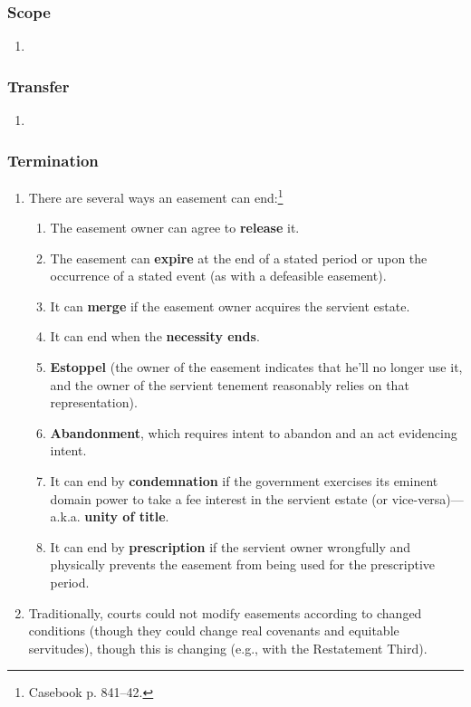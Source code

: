 \subsubsection{Scope}

\begin{enumerate}
    \item %
\end{enumerate}

\subsubsection{Transfer}

\begin{enumerate}
    \item %
\end{enumerate}

\subsubsection{Termination}

\begin{enumerate}
    \item There are several ways an easement can end:\footnote{Casebook p. 
    841--42.}
    \begin{enumerate}
        \item The easement owner can agree to \textbf{release} it.
        \item The easement can \textbf{expire} at the end of a stated period 
        or upon the occurrence of a stated event (as with a defeasible 
        easement).
        \item It can \textbf{merge} if the easement owner acquires the 
        servient estate.
        \item It can end when the \textbf{necessity ends}.
        \item \textbf{Estoppel} (the owner of the easement indicates that 
        he'll no longer use it, and the owner of the servient tenement 
        reasonably relies on that representation).
        \item \textbf{Abandonment}, which requires intent to abandon and an 
        act evidencing intent.
        \item It can end by \textbf{condemnation} if the government exercises 
        its eminent domain power to take a fee interest in the servient 
        estate (or vice-versa)---a.k.a. \textbf{unity of title}.
        \item It can end by \textbf{prescription} if the servient owner 
        wrongfully and physically prevents the easement from being used for 
        the prescriptive period.
    \end{enumerate}
    \item Traditionally, courts could not modify easements according to 
    changed conditions (though they could change real covenants and equitable 
    servitudes), though this is changing (e.g., with the Restatement Third).
\end{enumerate}

